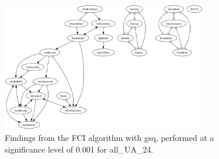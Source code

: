 \begin{figure}[htbp]
    \centering
    \includegraphics[width=0.8\textwidth]{Report/final_report/pictures/FCI_gsq_0.001_all_UA_24.png}
    \caption{Findings from the FCI algorithm with gsq, performed at a significance level of 0.001 for all_UA_24.}
    \label{fig:fci_gsq_0.001all_UA_24}
\end{figure}
